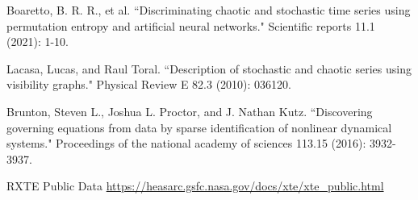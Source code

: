 \documentclass[10pt,conference]{IEEEtran}
\begin{document}
\begin{thebibliography}{1}
Boaretto, B. R. R., et al. ``Discriminating chaotic and stochastic time series using permutation entropy and artificial neural networks." Scientific reports 11.1 (2021): 1-10.

Lacasa, Lucas, and Raul Toral. ``Description of stochastic and chaotic series using visibility graphs." Physical Review E 82.3 (2010): 036120.

Brunton, Steven L., Joshua L. Proctor, and J. Nathan Kutz. ``Discovering governing equations from data by sparse identification of nonlinear dynamical systems." Proceedings of the national academy of sciences 113.15 (2016): 3932-3937.

 RXTE Public Data \url{https://heasarc.gsfc.nasa.gov/docs/xte/xte_public.html}

\end{thebibliography}

\end{document}
